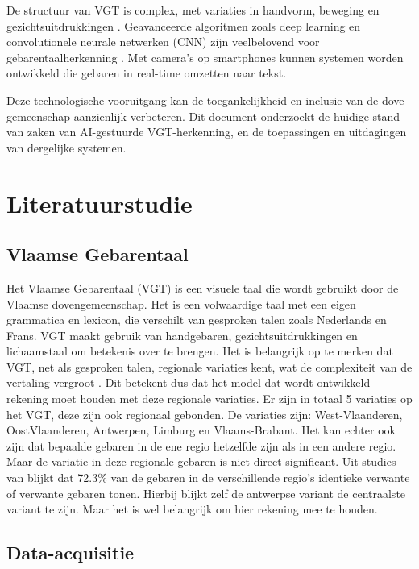 De structuur van VGT is complex, met variaties in handvorm, beweging en gezichtsuitdrukkingen \autocite{469340}. Geavanceerde algoritmen zoals deep learning en convolutionele neurale netwerken (CNN) zijn veelbelovend voor gebarentaalherkenning \autocite{10.52756/ijerr.2023.v34spl.004}\autocite{10.17485/ijst/v16i45.2583}. Met camera's op smartphones kunnen systemen worden ontwikkeld die gebaren in real-time omzetten naar tekst.

Deze technologische vooruitgang kan de toegankelijkheid en inclusie van de dove gemeenschap aanzienlijk verbeteren. Dit document onderzoekt de huidige stand van zaken van AI-gestuurde VGT-herkenning, en de toepassingen en uitdagingen van dergelijke systemen.
\section{Literatuurstudie}%
\label{sec:literatuurstudie}

\subsection{Vlaamse Gebarentaal}
\label{subsec:vgt}

Het Vlaamse Gebarentaal (VGT) is een visuele taal die wordt gebruikt door de Vlaamse dovengemeenschap. 
Het is een volwaardige taal met een eigen grammatica en lexicon, die verschilt van gesproken talen zoals Nederlands en Frans. 
VGT maakt gebruik van handgebaren, gezichtsuitdrukkingen en lichaamstaal om betekenis over te brengen. 
Het is belangrijk op te merken dat VGT, net als gesproken talen, regionale variaties kent, wat de complexiteit van de vertaling vergroot \autocite{469340}.
Dit betekent dus dat het model dat wordt ontwikkeld rekening moet houden met deze regionale variaties.
Er zijn in totaal 5 variaties op het VGT, deze zijn ook regionaal gebonden\autocite{469340}.
De variaties zijn: West-Vlaanderen, OostVlaanderen, Antwerpen, Limburg en Vlaams-Brabant.
Het kan echter ook zijn dat bepaalde gebaren in de ene regio hetzelfde zijn als in een andere regio.
Maar de variatie in deze regionale gebaren is niet direct significant.
Uit studies van \textcite{469340} blijkt dat 72.3\% van de gebaren in de verschillende regio's identieke verwante of verwante gebaren tonen.
Hierbij blijkt zelf de antwerpse variant de centraalste variant te zijn\autocite{469340}.
Maar het is wel belangrijk om hier rekening mee te houden.


\subsection{Data-acquisitie}
\label{subsec:data-acquisitie}

